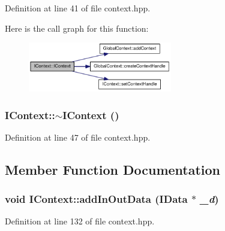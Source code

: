Definition at line 41 of file context.hpp.

Here is the call graph for this function:\nopagebreak
\begin{figure}[H]
\begin{center}
\leavevmode
\includegraphics[width=178pt]{class_i_context_a46c1edfdc2c9ff7eb8f274f10d98949f_cgraph}
\end{center}
\end{figure}
\hypertarget{class_i_context_a7a18ec7377bb445433ab130fa3259a6a}{
\subsubsection[{$\sim$IContext}]{\setlength{\rightskip}{0pt plus 5cm}IContext::$\sim$IContext ()}}
\label{class_i_context_a7a18ec7377bb445433ab130fa3259a6a}


Definition at line 47 of file context.hpp.

\subsection{Member Function Documentation}
\hypertarget{class_i_context_a6e2967c610f62b1e3d1411982efeead6}{
\subsubsection[{addInOutData}]{\setlength{\rightskip}{0pt plus 5cm}void IContext::addInOutData ({\bf IData} $\ast$ {\em \_\-d})}}
\label{class_i_context_a6e2967c610f62b1e3d1411982efeead6}


Definition at line 132 of file context.hpp.

